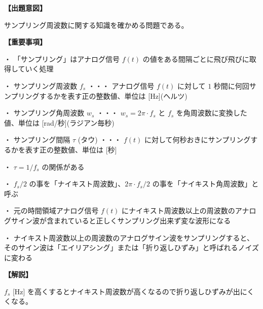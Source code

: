 \noindent \textbf{【出題意図】}

\noindent サンプリング周波数に関する知識を確かめる問題である。

\vspace{1em}
\noindent \textbf{【重要事項】}

\medskip
\noindent ・ 「サンプリング」はアナログ信号 $f(t)$ の値をある間隔ごとに飛び飛びに取得していく処理

\medskip
\noindent ・ サンプリング周波数 $f_s$ ・・・ アナログ信号 $f(t)$ に対して $1$ 秒間に何回サンプリングするかを表す正の整数値、単位は [Hz](ヘルツ)

\medskip
\noindent ・ サンプリング角周波数 $w_s$ ・・・ $w_s = 2\pi\cdot f_s$ と $f_s$ を角周波数に変換した値、単位は [rad/秒](ラジアン毎秒)

\medskip
\noindent ・ サンプリング間隔 $\tau$ (タウ) ・・・ $f(t)$ に対して何秒おきにサンプリングするかを表す正の整数値、単位は [秒]

\medskip
\noindent ・ $\tau = 1/f_s$ の関係がある

\medskip
\noindent ・ $f_s/2$ の事を「ナイキスト周波数」、$2\pi \cdot f_s/2$ の事を「ナイキスト角周波数」と呼ぶ

\medskip
\noindent ・ 元の時間領域アナログ信号 $f(t)$ にナイキスト周波数以上の周波数のアナログサイン波が含まれていると正しくサンプリング出来ず変な波形になる

\medskip
\noindent ・ ナイキスト周波数以上の周波数のアナログサイン波をサンプリングすると、そのサイン波は「エイリアシング」または「折り返しひずみ」と呼ばれるノイズに変わる

\vspace{1em}
\noindent \textbf{【解説】}

\noindent $f_s$ [Hz] を高くするとナイキスト周波数が高くなるので折り返しひずみが出にくくなる。
